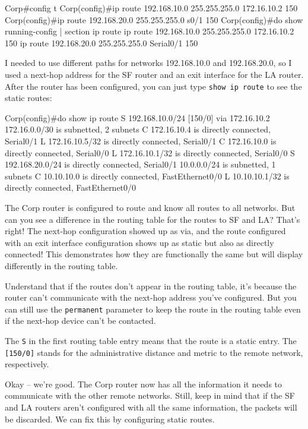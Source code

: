 \begin{cli}
Corp#config t
Corp(config)#ip route 192.168.10.0 255.255.255.0 172.16.10.2 150
Corp(config)#ip route 192.168.20.0 255.255.255.0 s0/1 150
Corp(config)#do show running-config | section ip route
ip route 192.168.10.0 255.255.255.0 172.16.10.2 150
ip route 192.168.20.0 255.255.255.0 Serial0/1 150
\end{cli}

I needed to use different paths for networks 192.168.10.0 and
192.168.20.0, so I used a next-hop address for the SF router and an exit
interface for the LA router. After the router has been configured, you
can just type \texttt{show\ ip\ route} to see the static routes:

\begin{cli}
Corp(config)#do show ip route
S    192.168.10.0/24 [150/0] via 172.16.10.2
     172.16.0.0/30 is subnetted, 2 subnets
C       172.16.10.4 is directly connected, Serial0/1
L       172.16.10.5/32 is directly connected, Serial0/1
C       172.16.10.0 is directly connected, Serial0/0
L       172.16.10.1/32 is directly connected, Serial0/0
S    192.168.20.0/24 is directly connected, Serial0/1
     10.0.0.0/24 is subnetted, 1 subnets
C       10.10.10.0 is directly connected, FastEthernet0/0
L       10.10.10.1/32 is directly connected, FastEthernet0/0
\end{cli}

The Corp router is configured to route and know all routes to all
networks. But can you see a difference in the routing table for the
routes to SF and LA? That's right! The next-hop configuration showed up
as via, and the route configured with an exit interface configuration
shows up as static but also as directly connected! This demonstrates how
they are functionally the same but will display differently in the
routing table.

Understand that if the routes don't appear in the routing table, it's
because the router can't communicate with the next-hop address you've
configured. But you can still use the \texttt{permanent} parameter to
keep the route in the routing table even if the next-hop device can't be
contacted.

The \texttt{S} in the first routing table entry means that the route is
a static entry. The \texttt{{[}150/0{]}} stands for the administrative
distance and metric to the remote network, respectively.

Okay -- we're good. The Corp router now has all the information it needs
to communicate with the other remote networks. Still, keep in mind that
if the SF and LA routers aren't configured with all the same
information, the packets will be discarded. We can fix this by
configuring static routes.

